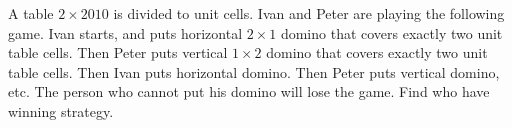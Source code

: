 A table $2 \times 2010$ is divided to unit cells. Ivan and Peter are playing the following game. Ivan starts, and puts horizontal $2 \times 1$ domino that covers exactly two unit table cells. Then Peter puts vertical $1 \times 2$ domino that covers exactly two unit table cells. Then Ivan puts horizontal domino. Then Peter puts vertical domino, etc. The person who cannot put his domino will lose the game. Find who have winning strategy.